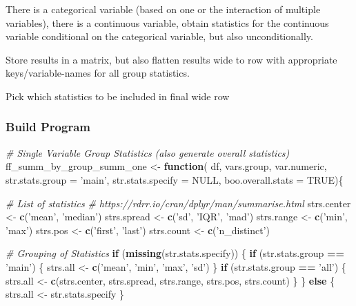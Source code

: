 \documentclass[
]{book}
\newenvironment{Shaded}{\begin{snugshade}}{\end{snugshade}}
\newcommand{\CommentTok}[1]{\textcolor[rgb]{0.56,0.35,0.01}{\textit{#1}}}
\newcommand{\ControlFlowTok}[1]{\textcolor[rgb]{0.13,0.29,0.53}{\textbf{#1}}}
\newcommand{\DataTypeTok}[1]{\textcolor[rgb]{0.13,0.29,0.53}{#1}}
\newcommand{\KeywordTok}[1]{\textcolor[rgb]{0.13,0.29,0.53}{\textbf{#1}}}
\newcommand{\NormalTok}[1]{#1}
\newcommand{\OperatorTok}[1]{\textcolor[rgb]{0.81,0.36,0.00}{\textbf{#1}}}
\newcommand{\OtherTok}[1]{\textcolor[rgb]{0.56,0.35,0.01}{#1}}
\newcommand{\StringTok}[1]{\textcolor[rgb]{0.31,0.60,0.02}{#1}}
\begin{document}
There is a categorical variable (based on one or the interaction of multiple variables), there is a continuous variable, obtain statistics for the continuous variable conditional on the categorical variable, but also unconditionally.

Store results in a matrix, but also flatten results wide to row with appropriate keys/variable-names for all group statistics.

Pick which statistics to be included in final wide row

\hypertarget{build-program}{%
\subsubsection{Build Program}\label{build-program}}

\begin{Shaded}
\begin{Highlighting}[]
\CommentTok{# Single Variable Group Statistics (also generate overall statistics)}
\NormalTok{ff_summ_by_group_summ_one <-}\StringTok{ }\ControlFlowTok{function}\NormalTok{(}
\NormalTok{  df, vars.group, var.numeric, }\DataTypeTok{str.stats.group =} \StringTok{'main'}\NormalTok{,}
  \DataTypeTok{str.stats.specify =} \OtherTok{NULL}\NormalTok{, }\DataTypeTok{boo.overall.stats =} \OtherTok{TRUE}\NormalTok{)\{}
  
  \CommentTok{# List of statistics}
  \CommentTok{# https://rdrr.io/cran/dplyr/man/summarise.html}
\NormalTok{  strs.center <-}\StringTok{ }\KeywordTok{c}\NormalTok{(}\StringTok{'mean'}\NormalTok{, }\StringTok{'median'}\NormalTok{)}
\NormalTok{  strs.spread <-}\StringTok{ }\KeywordTok{c}\NormalTok{(}\StringTok{'sd'}\NormalTok{, }\StringTok{'IQR'}\NormalTok{, }\StringTok{'mad'}\NormalTok{)}
\NormalTok{  strs.range <-}\StringTok{ }\KeywordTok{c}\NormalTok{(}\StringTok{'min'}\NormalTok{, }\StringTok{'max'}\NormalTok{)}
\NormalTok{  strs.pos <-}\StringTok{ }\KeywordTok{c}\NormalTok{(}\StringTok{'first'}\NormalTok{, }\StringTok{'last'}\NormalTok{)}
\NormalTok{  strs.count <-}\StringTok{ }\KeywordTok{c}\NormalTok{(}\StringTok{'n_distinct'}\NormalTok{)}
  
  \CommentTok{# Grouping of Statistics}
  \ControlFlowTok{if}\NormalTok{ (}\KeywordTok{missing}\NormalTok{(str.stats.specify)) \{}
    \ControlFlowTok{if}\NormalTok{ (str.stats.group }\OperatorTok{==}\StringTok{ 'main'}\NormalTok{) \{}
\NormalTok{      strs.all <-}\StringTok{ }\KeywordTok{c}\NormalTok{(}\StringTok{'mean'}\NormalTok{, }\StringTok{'min'}\NormalTok{, }\StringTok{'max'}\NormalTok{, }\StringTok{'sd'}\NormalTok{)}
\NormalTok{    \}}
    \ControlFlowTok{if}\NormalTok{ (str.stats.group }\OperatorTok{==}\StringTok{ 'all'}\NormalTok{) \{}
\NormalTok{      strs.all <-}\StringTok{ }\KeywordTok{c}\NormalTok{(strs.center, strs.spread, strs.range, strs.pos, strs.count)}
\NormalTok{    \}}
\NormalTok{  \} }\ControlFlowTok{else}\NormalTok{ \{}
\NormalTok{    strs.all <-}\StringTok{ }\NormalTok{str.stats.specify}
\NormalTok{  \}}
  

\end{Highlighting}
\end{Shaded}
\end{document}
